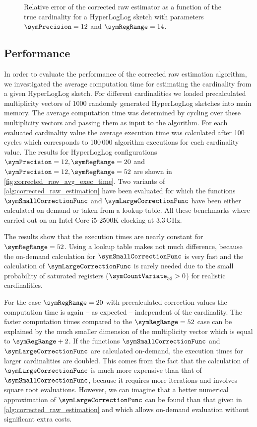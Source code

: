\documentclass[a4paper]{scrartcl}
\begin{document}
\begin{figure}
\centering

\caption{Relative error of the corrected raw estimator as a function of the true cardinality for a HyperLogLog sketch with parameters $\symPrecision = 12$ and $\symRegRange=14$.}
\label{fig:raw_corrected_estimation_error_12_14}
\end{figure}

\subsection{Performance}
\label{sec:corrected_raw_estimation_algorithm}
In order to evaluate the performance of the corrected raw estimation algorithm, we investigated the average computation time for estimating the cardinality from a given HyperLogLog sketch. For different cardinalities we loaded precalculated multiplicity vectors of 1000 randomly generated HyperLogLog sketches into main memory. The average computation time was determined by cycling over these multiplicity vectors and passing them as input to the algorithm. For each evaluated cardinality value the average execution time was calculated after 100 cycles which corresponds to 100\,000 algorithm executions for each cardinality value. The results for HyperLogLog configurations $\symPrecision=12, \symRegRange=20$ and $\symPrecision=12, \symRegRange=52$ are shown in \cref{fig:corrected_raw_avg_exec_time}. Two variants of \cref{alg:corrected_raw_estimation} have been evaluated for which the functions $\symSmallCorrectionFunc$ and $\symLargeCorrectionFunc$ have been either calculated on-demand or taken from a lookup table. All these benchmarks where carried out on an Intel Core i5-2500K clocking at 3.3\,GHz. 

The results show that the execution times are nearly constant for $\symRegRange=52$. Using a lookup table makes not much difference, because the on-demand calculation for  $\symSmallCorrectionFunc$ is very fast and the calculation of $\symLargeCorrectionFunc$ is rarely needed due to the small probability of saturated registers ($\symCountVariate_{53}>0$) for realistic cardinalities.

For the case $\symRegRange=20$ with precalculated correction values the computation time is again -- as expected -- independent of the cardinality. The faster computation times compared to the $\symRegRange=52$ case can be explained by the much smaller dimension of the multiplicity vector which is equal to $\symRegRange+2$. If the functions $\symSmallCorrectionFunc$ and $\symLargeCorrectionFunc$ are calculated on-demand, the execution times for larger cardinalities are doubled. This comes from the fact that the calculation of $\symLargeCorrectionFunc$ is much more expensive than that of $\symSmallCorrectionFunc$, because it requires more iterations and involves square root evaluations. However, we can imagine that a better numerical approximation of $\symLargeCorrectionFunc$ can be found than that given in \cref{alg:corrected_raw_estimation} and which allows on-demand evaluation without significant extra costs.
\end{document}
